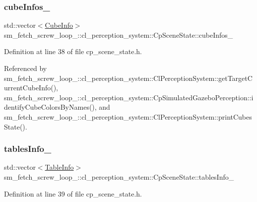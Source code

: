 \subsubsection{\texorpdfstring{cube\+Infos\+\_\+}{cubeInfos\_}}
{\footnotesize\ttfamily std\+::vector$<$\hyperlink{structsm__fetch__screw__loop__1_1_1cl__perception__system_1_1CubeInfo}{Cube\+Info}$>$ sm\+\_\+fetch\+\_\+screw\+\_\+loop\+\_\+::cl\+\_\+perception\+\_\+system\+::\+Cp\+Scene\+State\+::cube\+Infos\+\_\+}



Definition at line 38 of file cp\+\_\+scene\+\_\+state.\+h.



Referenced by sm\+\_\+fetch\+\_\+screw\+\_\+loop\+\_\+::cl\+\_\+perception\+\_\+system\+::\+Cl\+Perception\+System\+::get\+Target\+Current\+Cube\+Info(), sm\+\_\+fetch\+\_\+screw\+\_\+loop\+\_\+::cl\+\_\+perception\+\_\+system\+::\+Cp\+Simulated\+Gazebo\+Perception\+::identify\+Cube\+Colors\+By\+Names(), and sm\+\_\+fetch\+\_\+screw\+\_\+loop\+\_\+::cl\+\_\+perception\+\_\+system\+::\+Cl\+Perception\+System\+::print\+Cubes\+State().

\mbox{\label{classsm__fetch__screw__loop__1_1_1cl__perception__system_1_1CpSceneState_adc87f7a438a7030adfaa9e94f0e8f4e0}} 
\subsubsection{\texorpdfstring{tables\+Info\+\_\+}{tablesInfo\_}}
{\footnotesize\ttfamily std\+::vector$<$\hyperlink{structsm__fetch__screw__loop__1_1_1cl__perception__system_1_1TableInfo}{Table\+Info}$>$ sm\+\_\+fetch\+\_\+screw\+\_\+loop\+\_\+::cl\+\_\+perception\+\_\+system\+::\+Cp\+Scene\+State\+::tables\+Info\+\_\+}



Definition at line 39 of file cp\+\_\+scene\+\_\+state.\+h.



